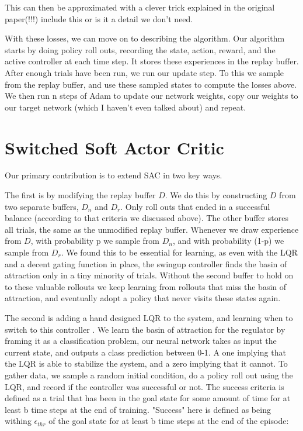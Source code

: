 \documentclass[letterpaper, 10 pt, conference]{ieeeconf}
\begin{document}
This can then be approximated with a clever trick explained in the original paper(!!!) include this or is it a detail we don't need.

With these losses, we can move on to describing the algorithm. Our algorithm starts by doing policy roll outs, recording the state, action, reward, and the active controller at each time step. It stores these experiences in the replay buffer. After enough trials have been run, we run our update step. To this we sample from the replay buffer, and use these sampled states to compute the losses above. We then run n steps of Adam \cite{kingma_adam:_2014} to update our network weights, copy our weights to our target network (which I haven't even talked about) and repeat. 



\section{Switched Soft Actor Critic}

Our primary contribution is to extend SAC in two key ways. 

The first is by modifying the replay buffer $D$. We do this by constructing $D$ from two separate buffers, $D_{n}$ and $D_{r}$. Only roll outs that ended in a successful balance (according to that criteria we discussed above). The other buffer stores all trials, the same as the unmodified replay buffer. Whenever we draw experience from $D$, with probability p we sample from $D_{n}$, and with probability (1-p) we sample from $D_{r}$. We found this to be essential for learning, as even with the LQR and a decent gating function in place, the swingup controller finds the basin of attraction only in a tiny minority of trials. Without the second buffer to hold on to these valuable rollouts we keep learning from rollouts that miss the basin of attraction, and eventually adopt a policy that never visits these states again. 


The second is adding a hand designed LQR to the system, and learning when to switch to this controller . We learn the basin of attraction for the regulator by framing it as a classification problem, our neural network takes as input the current state, and outputs a class prediction between 0-1. A one implying that the LQR is able to stabilize the system, and a zero implying that it cannot. To gather data, we sample a random initial condition, do a policy roll out using the LQR, and record if the controller was successful or not. The success criteria is defined as a trial that has been in the goal state for some amount of time for at least b time steps at the end of training. "Success" here is defined as being withing $\epsilon_{thr}$ of the goal state for at least b time steps at the end of the episode:
\end{document}
